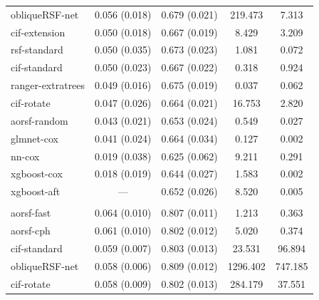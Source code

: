 \documentclass[12pt]{article}\usepackage[]{graphicx}\usepackage[]{xcolor}
\newenvironment{knitrout}{}{} %
\begin{document}
\begin{knitrout}
\begin{longtable}[t]{lcccc}
\hspace{1em}obliqueRSF-net & 0.056 (0.018) & 0.679 (0.021) & 219.473 & 7.313\\
\hspace{1em}cif-extension & 0.050 (0.018) & 0.667 (0.019) & 8.429 & 3.209\\
\hspace{1em}rsf-standard & 0.050 (0.035) & 0.673 (0.023) & 1.081 & 0.072\\
\hspace{1em}cif-standard & 0.050 (0.023) & 0.667 (0.022) & 0.318 & 0.924\\
\hspace{1em}ranger-extratrees & 0.049 (0.016) & 0.675 (0.019) & 0.037 & 0.062\\
\hspace{1em}cif-rotate & 0.047 (0.026) & 0.664 (0.021) & 16.753 & 2.820\\
\hspace{1em}aorsf-random & 0.043 (0.021) & 0.653 (0.024) & 0.549 & 0.027\\
\hspace{1em}glmnet-cox & 0.041 (0.024) & 0.664 (0.034) & 0.127 & 0.002\\
\hspace{1em}nn-cox & 0.019 (0.038) & 0.625 (0.062) & 9.211 & 0.291\\
\hspace{1em}xgboost-cox & 0.018 (0.019) & 0.644 (0.027) & 1.583 & 0.002\\
\hspace{1em}xgboost-aft & --- & 0.652 (0.026) & 8.520 & 0.005\\
\addlinespace[0.3em]
\multicolumn{5}{l}{\textit{\textbf{MESA; coronary heart disease, n = 6785, p = 48}}}\\
\hline
\hspace{1em}aorsf-fast & 0.064 (0.010) & 0.807 (0.011) & 1.213 & 0.363\\
\hspace{1em}aorsf-cph & 0.061 (0.010) & 0.802 (0.012) & 5.020 & 0.374\\
\hspace{1em}cif-standard & 0.059 (0.007) & 0.803 (0.013) & 23.531 & 96.894\\
\hspace{1em}obliqueRSF-net & 0.058 (0.006) & 0.809 (0.012) & 1296.402 & 747.185\\
\hspace{1em}cif-rotate & 0.058 (0.009) & 0.802 (0.013) & 284.179 & 37.551\\

\end{longtable}
\end{knitrout}
\end{document}
